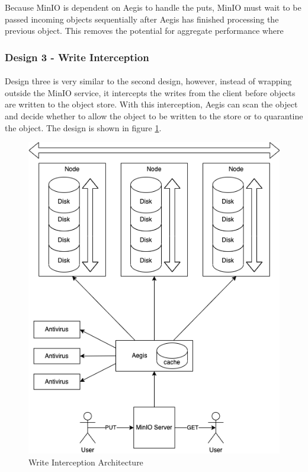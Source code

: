 \documentclass[12pt, conference, final, a4paper, onecolumn, compsoc]{IEEEtran}
\begin{document}

    Because MinIO is dependent on Aegis to handle the puts, MinIO must wait to
    be passed incoming objects sequentially after Aegis has finished processing
    the previous object. This removes the potential for aggregate performance
    where


    \subsubsection*{Design 3 - Write Interception}
    \paragraph{}


    Design three is very similar to the second design, however, instead of
    wrapping outside the MinIO service, it intercepts the writes from the client
    before objects are written to the object store. With this interception,
    Aegis can scan the object and decide whether to allow the object to be
    written to the store or to quarantine the object. The design is shown in
    figure \ref{fig:writeInterceptArch}.

    \begin{figure}
      \centering \includegraphics[scale=.3]{diagrams/write-intercept.png}
      \caption{Write Interception Architecture}
      \label{fig:writeInterceptArch}
    \end{figure}
\end{document}
